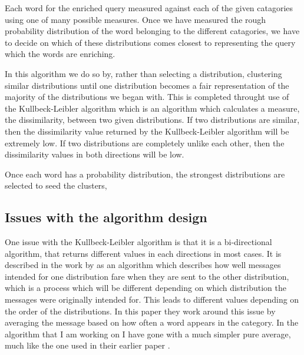 \documentclass[letterpaper]{article}
\begin{document}
Each word for the enriched query measured against each of the given catagories using one of many possible measures. Once we have measured the rough probability distribution of the word
belonging to the different catagories, we have to decide on which of these distributions comes closest to representing the query which the words are enriching. 

In this algorithm we do so by, rather than selecting a distribution, clustering similar distributions until one distribution becomes a fair representation of the majority of the distributions
we began with. This is completed throught use of the Kullbeck-Leibler algorithm \cite{kullbeckLeibler} which is an algorithm which calculates a measure, the dissimilarity, between two given distributions. If two distributions are similar, then the dissimilarity value returned by the Kullbeck-Leibler algorithm will be extremely low. If two distributions are completely unlike each other, then the dissimilarity values in both directions will be low. 

Once each word has a probability distribution, the strongest distributions are selected to seed the clusters, 

\subsection{Issues with the algorithm design}
One issue with the Kullbeck-Leibler algorithm is that it is a bi-directional algorithm, that returns different values in each directions in most cases. 
It is described in the work by \cite{distCluster} as an algorithm which describes how well messages intended for one distribution fare when they are sent to the other distribution, which is a process which will be different depending on which distribution the messages were originally intended for. 
This leads to different values depending on the order of the distributions. 
In this paper they work around this issue by averaging the message based on how often a word appears in the category. 
In the algorithm that I am working on I have gone with a much simpler pure average, much like the one used in their earlier paper \cite{distClusterEarlier}.
\end{document}
